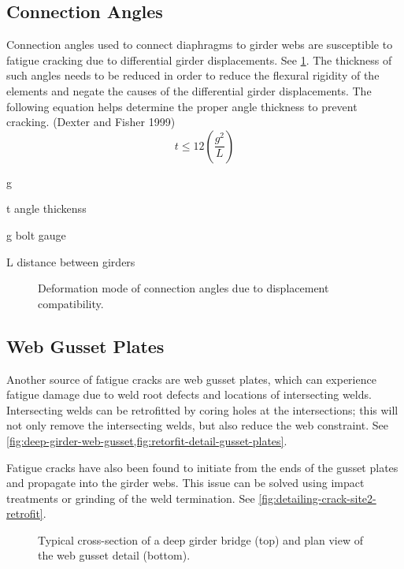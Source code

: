 \subsection{Connection Angles}
Connection angles used to connect diaphragms to girder webs are susceptible to fatigue cracking due to differential girder displacements. See \cref{fig:deformation-mode-coneection-angles}. The thickness of such angles needs to be reduced in order to reduce the flexural rigidity of the elements and negate the causes of the differential girder displacements. The following equation helps determine the proper angle thickness to prevent cracking. (Dexter and Fisher 1999)
\begin{equation}
  t\leqslant 12\left(\frac{g^2}{L}\right)
\end{equation}
\begin{EqDesc}{g}
  \item[t] angle thickenss
  \item[g] bolt gauge
  \item[L] distance between girders
\end{EqDesc}

\begin{figure}
  \caption{Deformation mode of connection angles due to displacement compatibility.}
  \label{fig:deformation-mode-coneection-angles}
\end{figure}

\subsection{Web Gusset Plates}
Another source of fatigue cracks are web gusset plates, which can experience fatigue damage due to weld root defects and locations of intersecting welds. Intersecting welds can be retrofitted by coring holes at the intersections; this will not only remove the intersecting welds, but also reduce the web constraint. See \cref{fig:deep-girder-web-gusset,fig:retorfit-detail-gusset-plates}.

Fatigue cracks have also been found to initiate from the ends of the gusset plates and propagate into the girder webs. This issue can be solved using impact treatments or grinding of the weld termination. See \cref{fig:detailing-crack-site2-retrofit}.

\begin{figure}
  \caption{Typical cross-section of a deep girder bridge (top) and plan view of the web gusset detail (bottom).}
  \label{fig:deep-girder-web-gusset}
\end{figure}

